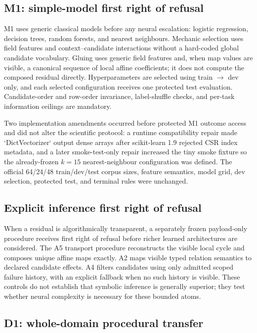 \documentclass[10pt]{article}
\begin{document}
\subsection{M1: simple-model first right of refusal}

M1 uses generic classical models before any neural escalation: logistic regression, decision trees, random forests, and nearest neighbours. Mechanic selection uses field features and context--candidate interactions without a hard-coded global candidate vocabulary. Gluing uses generic field features and, when map values are visible, a canonical sequence of local affine coefficients; it does not compute the composed residual directly. Hyperparameters are selected using train $\rightarrow$ dev only, and each selected configuration receives one protected test evaluation. Candidate-order and row-order invariance, label-shuffle checks, and per-task information ceilings are mandatory.

Two implementation amendments occurred before protected M1 outcome access and did not alter the scientific protocol: a runtime compatibility repair made `DictVectorizer` output dense arrays after scikit-learn 1.9 rejected CSR index metadata, and a later smoke-test-only repair increased the tiny smoke fixture so the already-frozen $k=15$ nearest-neighbour configuration was defined. The official 64/24/48 train/dev/test corpus sizes, feature semantics, model grid, dev selection, protected test, and terminal rules were unchanged.

\subsection{Explicit inference first right of refusal}

When a residual is algorithmically transparent, a separately frozen payload-only procedure receives first right of refusal before richer learned architectures are considered. The A5 transport procedure reconstructs the visible local cycle and composes unique affine maps exactly. A2 maps visible typed relation semantics to declared candidate effects. A4 filters candidates using only admitted scoped failure history, with an explicit fallback when no such history is visible. These controls do not establish that symbolic inference is generally superior; they test whether neural complexity is necessary for these bounded atoms.

\subsection{D1: whole-domain procedural transfer}
\end{document}
